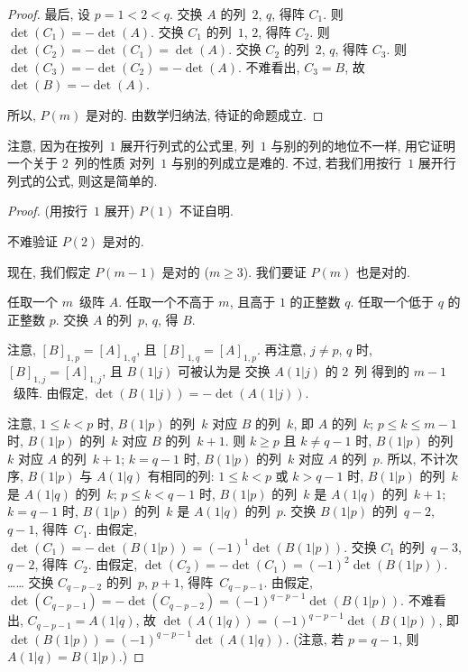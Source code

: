 \documentclass[../libro.tex]{subfiles}
\begin{document}
\begin{proof}
    最后, 设 \(p = 1 < 2 < q\).
    交换 \(A\) 的列~\(2\), \(q\),
    得阵 \(C_1\).
    则 \(\det {(C_1)} = -\det {(A)}\).
    交换 \(C_1\) 的列~\(1\), \(2\),
    得阵 \(C_2\).
    则 \(\det {(C_2)} = -\det {(C_1)} = \det {(A)}\).
    交换 \(C_2\) 的列~\(2\), \(q\),
    得阵 \(C_3\).
    则 \(\det {(C_3)} = -\det {(C_2)} = -\det {(A)}\).
    不难看出, \(C_3 = B\),
    故 \(\det {(B)} = -\det {(A)}\).

    所以, \(P(m)\) 是对的.
    由数学归纳法, 待证的命题成立.
\end{proof}

注意, 因为在按列~\(1\) 展开行列式的公式里,
列~\(1\) 与别的列的地位不一样,
用它证明一个关于 \(2\)~列的性质%
对列~\(1\) 与别的列成立是难的.
不过, 若我们用按行~\(1\) 展开行列式的公式,
则这是简单的.

\begin{proof}
    (用按行~\(1\) 展开)
    \(P(1)\) 不证自明.

    不难验证 \(P(2)\) 是对的.

    现在, 我们假定 \(P(m-1)\) 是对的 (\(m \geq 3\)).
    我们要证 \(P(m)\) 也是对的.

    任取一个 \(m\)~级阵 \(A\).
    任取一个不高于 \(m\), 且高于 \(1\) 的正整数 \(q\).
    任取一个低于 \(q\) 的正整数 \(p\).
    交换 \(A\) 的列~\(p\), \(q\), 得 \(B\).

    注意, \([B]_{1,p} = [A]_{1,q}\),
    且 \([B]_{1,q} = [A]_{1,p}\).
    再注意, \(j \neq p\), \(q\) 时,
    \([B]_{1,j} = [A]_{1,j}\),
    且 \(B(1|j)\) 可被认为是%
    交换 \(A(1|j)\) 的 \(2\)~列%
    得到的 \(m-1\)~级阵.
    由假定,
    \(\det {(B(1|j))} = -\det {(A(1|j))}\).

    注意, \(1 \leq k < p\) 时,
    \(B(1|p)\) 的列~\(k\) 对应 \(B\) 的列~\(k\),
    即 \(A\) 的列~\(k\);
    \(p \leq k \leq m-1\) 时,
    \(B(1|p)\) 的列~\(k\) 对应 \(B\) 的列~\(k+1\).
    则 \(k \geq p\) 且 \(k \neq q-1\) 时,
    \(B(1|p)\) 的列~\(k\) 对应 \(A\) 的列~\(k+1\);
    \(k = q-1\) 时,
    \(B(1|p)\) 的列~\(k\) 对应 \(A\) 的列~\(p\).
    所以, 不计次序,
    \(B(1|p)\) 与 \(A(1|q)\) 有相同的列:
    \(1 \leq k < p\) 或 \(k > q-1\) 时,
    \(B(1|p)\) 的列~\(k\) 是 \(A(1|q)\) 的列~\(k\);
    \(p \leq k < q-1\) 时,
    \(B(1|p)\) 的列~\(k\) 是 \(A(1|q)\) 的列~\(k+1\);
    \(k = q-1\) 时,
    \(B(1|p)\) 的列~\(k\) 是 \(A(1|q)\) 的列~\(p\).
    交换 \(B(1|p)\) 的列~\(q-2\), \(q-1\), 得阵~\(C_1\).
    由假定, \(\det {(C_1)} = -\det {(B(1|p))}
    = (-1)^{1} \det {(B(1|p))}\).
    交换 \(C_1\) 的列~\(q-3\), \(q-2\), 得阵~\(C_2\).
    由假定, \(\det {(C_2)} = -\det {(C_1)}
    = (-1)^{2} \det {(B(1|p))}\).
    ……
    交换 \(C_{q-p-2}\) 的列~\(p\), \(p+1\), 得阵~\(C_{q-p-1}\).
    由假定, \(\det {(C_{q-p-1})} = -\det {(C_{q-p-2})}
    = (-1)^{q-p-1} \det {(B(1|p))}\).
    不难看出, \(C_{q-p-1} = A(1|q)\),
    故 \(\det {(A(1|q))} = (-1)^{q-p-1} \det {(B(1|p))}\),
    即 \(\det {(B(1|p))} = (-1)^{q-p-1} \det {(A(1|q))}\).
    (注意, 若 \(p = q-1\), 则 \(A(1|q) = B(1|p)\).)


\end{proof}
\end{document}
